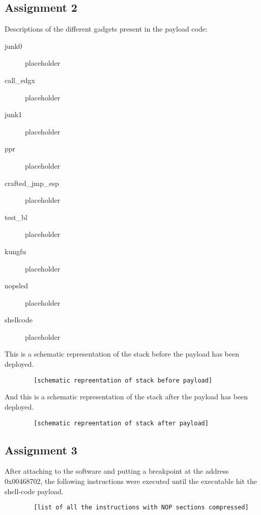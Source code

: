 \documentclass[10pt]{article}
\begin{document}
    \subsection{Assignment 2}

      Descriptions of the different gadgets present in the payload code:

      \begin{description}
        \item[junk0]{placeholder}
        \item[call\_edgx]{placeholder}
        \item[junk1]{placeholder}
        \item[ppr]{placeholder}
        \item[crafted\_jmp\_esp]{placeholder}
        \item[test\_bl]{placeholder}
        \item[kungfu]{placeholder}
        \item[nopsled]{placeholder}
        \item[shellcode]{placeholder}
      \end{description}

      This is a schematic representation of the stack before the payload has
      been deployed.

      \begin{verbatim}
        [schematic repreentation of stack before payload]
      \end{verbatim}

      And this is a schematic representation of the stack after the payload
      has been deployed.

      \begin{verbatim}
        [schematic repreentation of stack after payload]
      \end{verbatim}

    \subsection{Assignment 3}

      After attaching to the software and putting a breakpoint at the address
      0x00468702, the following instructions were executed until the executable
      hit the shell-code payload.

      \begin{verbatim}
        [list of all the instructions with NOP sections compressed]
      \end{verbatim}
\end{document}

